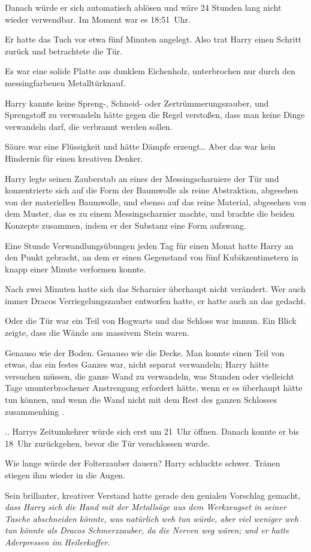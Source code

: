 {Danach würde er sich automatisch ablösen und wäre 24 Stunden lang nicht wieder verwendbar. Im Moment war es 18:51~Uhr.

Er hatte das Tuch vor etwa fünf Minuten angelegt. Also trat Harry einen Schritt zurück und betrachtete die Tür.

Es war eine solide Platte aus dunklem Eichenholz, unterbrochen nur durch den messingfarbenen Metalltürknauf.

Harry kannte keine Spreng-, Schneid- oder Zertrümmerungszauber, und Sprengstoff zu verwandeln hätte gegen die Regel verstoßen, dass man keine Dinge verwandeln darf, die verbrannt werden sollen.

Säure war eine Flüssigkeit und hätte Dämpfe erzeugt… Aber das war kein Hindernis für einen kreativen Denker.

Harry legte seinen Zauberstab an eines der Messingscharniere der Tür und konzentrierte sich auf die Form der Baumwolle als reine Abstraktion, abgesehen von der materiellen Baumwolle, und ebenso auf das reine Material, abgesehen von dem Muster, das es zu einem Messingscharnier machte, und brachte die beiden Konzepte zusammen, indem er der Substanz eine Form aufzwang.

Eine Stunde Verwandlungsübungen jeden Tag für einen Monat hatte Harry an den Punkt gebracht, an dem er einen Gegenstand von fünf Kubikzentimetern in knapp einer Minute verformen konnte.

Nach zwei Minuten hatte sich das Scharnier überhaupt nicht verändert. Wer auch immer Dracos Verriegelungszauber entworfen hatte, er hatte auch an das gedacht.

Oder die Tür war ein Teil von Hogwarts und das Schloss war immun. Ein Blick zeigte, dass die Wände aus massivem Stein waren.

Genauso wie der Boden. Genauso wie die Decke. Man konnte einen Teil von etwas, das ein festes Ganzes war, nicht separat verwandeln; Harry hätte versuchen müssen, die ganze Wand zu verwandeln, was Stunden oder vielleicht Tage ununterbrochener Anstrengung erfordert hätte, wenn er es überhaupt hätte tun können, und wenn die Wand nicht mit dem Rest des ganzen Schlosses zusammenhing .

.. Harrys Zeitumkehrer würde sich erst um 21~Uhr öffnen. Danach konnte er bis 18~Uhr zurückgehen, bevor die Tür verschlossen wurde.

Wie lange würde der Folterzauber dauern? Harry schluckte schwer. Tränen stiegen ihm wieder in die Augen.

Sein brillanter, kreativer Verstand hatte gerade den genialen Vorschlag gemacht, \emph{dass Harry sich die Hand mit der Metallsäge aus dem Werkzeugset in seiner Tasche abschneiden könnte, was natürlich weh tun würde, aber viel weniger weh tun könnte als Dracos Schmerzzauber, da die Nerven weg wären; und er hatte Aderpressen im Heilerkoffer.}

}
